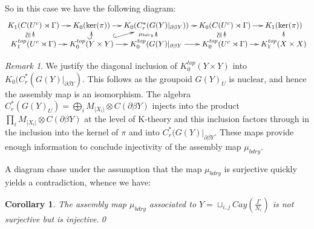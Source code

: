 \documentclass[11pt]{amsart}
\theoremstyle{plain}
\newtheorem{corollary}[theorem]{Corollary}%
\theoremstyle{definition}%
\theoremstyle{remark}%
\newtheorem{remark}[theorem]{Remark}%
\newcommand{\ucong}{\rotatebox{90}{$\cong$}}
\begin{document}
So in this case we have the following diagram:
\begin{equation*}
\xymatrix@=0.7em{
 K_{1}(C(U^{c})\rtimes \Gamma) \ar[r] & K_{0}(\ker (\pi)) \ar[r]& K_{0}(C^{*}_{r}(G(Y)|_{\partial\beta Y})) \ar[r]& K_{0}(C(U^{c})\rtimes \Gamma)\ar[r] & K_{1}(\ker (\pi))  \\
 K_{1}^{top}(U^{c}\rtimes \Gamma) \ar[r] \ar[u]^{\ucong}& K_{0}^{top}(Y \times Y) \ar[r]\ar@{^{(}->}[u]\ar@{^{(}->}[ru]& K_{0}^{top}(G(Y)|_{\partial\beta Y} \ar[r]\ar[u]^{\mu_{bdry}}& K_{0}^{top}(U^{c}\rtimes \Gamma) \ar[r]\ar[u]^{\ucong}& K_{1}^{top}(X \times X)\ar[u]
}
\end{equation*}

\begin{remark}
We justify the diagonal inclusion of $K_{0}^{top}(Y \times Y)$ into $K_{0}(C^{*}_{r}(G(Y)|_{\partial\beta Y})$. This follows as the groupoid $G(Y)_{U}$ is nuclear, and hence the assembly map is an isomorphism.   The algebra $C^{*}_{r}(G(Y)_{U})= \bigoplus_{i}M_{\vert X_{i}\vert} \otimes C(\partial\beta Y)$ injects into the product $\prod_{i} M_{\vert X_{i}\vert} \otimes C(\partial\beta Y)$ at the level of K-theory and this inclusion factors through in the inclusion into the kernel of $\pi$ and into $C^{*}_{r}(G(Y)|_{\partial\beta Y}$. These maps provide enough information to conclude injectivity of the assembly map $\mu_{bdry}$.
\end{remark}

A diagram chase under the assumption that the map $\mu_{bdry}$ is surjective quickly yields a contradiction, whence we have:

\begin{corollary}
The assembly map $\mu_{bdry}$ associated to $Y=\sqcup_{i,j}Cay(\frac{\Gamma}{N_{i}})$ is not surjective but is injective.\qed
\end{corollary}


\end{document}
